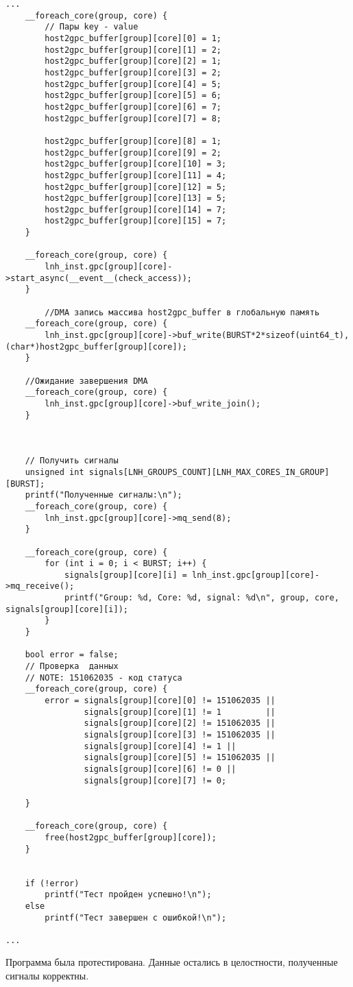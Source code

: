 \captionsetup{singlelinecheck = false, justification=raggedright}
\begin{lstlisting}[style={c++},label={lst:las1}, caption={Проверка работы функции}]
    ...
	__foreach_core(group, core) {
		// Пары key - value
		host2gpc_buffer[group][core][0] = 1;
		host2gpc_buffer[group][core][1] = 2;
		host2gpc_buffer[group][core][2] = 1;
		host2gpc_buffer[group][core][3] = 2;
		host2gpc_buffer[group][core][4] = 5;
		host2gpc_buffer[group][core][5] = 6;
		host2gpc_buffer[group][core][6] = 7;
		host2gpc_buffer[group][core][7] = 8;

		host2gpc_buffer[group][core][8] = 1;
		host2gpc_buffer[group][core][9] = 2;
		host2gpc_buffer[group][core][10] = 3;
		host2gpc_buffer[group][core][11] = 4;
		host2gpc_buffer[group][core][12] = 5;
		host2gpc_buffer[group][core][13] = 5;
		host2gpc_buffer[group][core][14] = 7;
		host2gpc_buffer[group][core][15] = 7;
	}

	__foreach_core(group, core) {
		lnh_inst.gpc[group][core]->start_async(__event__(check_access));
	}

		//DMA запись массива host2gpc_buffer в глобальную память
	__foreach_core(group, core) {
		lnh_inst.gpc[group][core]->buf_write(BURST*2*sizeof(uint64_t),(char*)host2gpc_buffer[group][core]);
	}

	//Ожидание завершения DMA
	__foreach_core(group, core) {
		lnh_inst.gpc[group][core]->buf_write_join();
	}



	// Получить сигналы
	unsigned int signals[LNH_GROUPS_COUNT][LNH_MAX_CORES_IN_GROUP][BURST];
	printf("Полученные сигналы:\n");
	__foreach_core(group, core) {
		lnh_inst.gpc[group][core]->mq_send(8);
	}

	__foreach_core(group, core) {
		for (int i = 0; i < BURST; i++) {
			signals[group][core][i] = lnh_inst.gpc[group][core]->mq_receive();
			printf("Group: %d, Core: %d, signal: %d\n", group, core, signals[group][core][i]);
		}
	}

	bool error = false;
	// Проверка  данных
	// NOTE: 151062035 - код статуса
	__foreach_core(group, core) {
		error = signals[group][core][0] != 151062035 ||
				signals[group][core][1] != 1		 ||
				signals[group][core][2] != 151062035 ||
				signals[group][core][3] != 151062035 ||
				signals[group][core][4] != 1 ||
				signals[group][core][5] != 151062035 ||
				signals[group][core][6] != 0 ||
				signals[group][core][7] != 0;
				
	}

	__foreach_core(group, core) {
		free(host2gpc_buffer[group][core]);
	}


	if (!error)
		printf("Тест пройден успешно!\n");
	else
		printf("Тест завершен с ошибкой!\n");

...
\end{lstlisting}
% 

% 

Программа была протестирована. Данные остались в целостности, полученные сигналы корректны.